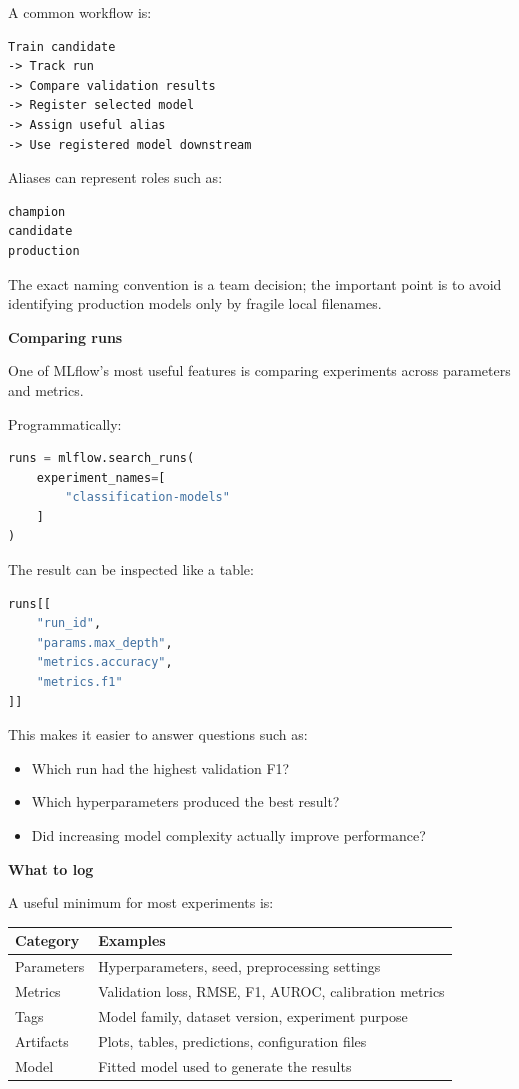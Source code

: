 \documentclass[11pt,letterpaper]{article}
\begin{document}
A common workflow is:

\begin{lstlisting}
Train candidate
-> Track run
-> Compare validation results
-> Register selected model
-> Assign useful alias
-> Use registered model downstream
\end{lstlisting}

Aliases can represent roles such as:

\begin{lstlisting}
champion
candidate
production
\end{lstlisting}

The exact naming convention is a team decision; the important point is to
avoid identifying production models only by fragile local filenames.

\textbf{Comparing runs}

One of MLflow's most useful features is comparing experiments across
parameters and metrics.

Programmatically:

\begin{lstlisting}[language=Python]
runs = mlflow.search_runs(
    experiment_names=[
        "classification-models"
    ]
)
\end{lstlisting}

The result can be inspected like a table:

\begin{lstlisting}[language=Python]
runs[[
    "run_id",
    "params.max_depth",
    "metrics.accuracy",
    "metrics.f1"
]]
\end{lstlisting}

This makes it easier to answer questions such as:

\begin{itemize}[leftmargin=*]
    \item Which run had the highest validation F1?
    \item Which hyperparameters produced the best result?
    \item Did increasing model complexity actually improve performance?
\end{itemize}

\textbf{What to log}

A useful minimum for most experiments is:

\begin{center}
\begin{tabularx}{\textwidth}{lX}
\toprule
Category & Examples \\
\midrule
Parameters & Hyperparameters, seed, preprocessing settings \\
Metrics & Validation loss, RMSE, F1, AUROC, calibration metrics \\
Tags & Model family, dataset version, experiment purpose \\
Artifacts & Plots, tables, predictions, configuration files \\
Model & Fitted model used to generate the results \\
\bottomrule
\end{tabularx}
\end{center}
\end{document}
